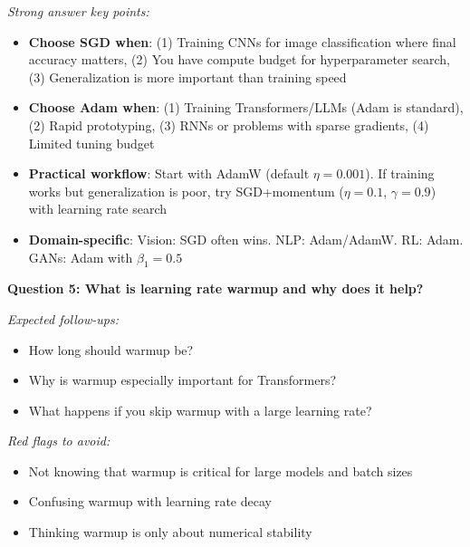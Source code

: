 \documentclass[../../main.tex]{subfiles}
\begin{document}
\begin{interviewquestions}
\textit{Strong answer key points:}
\begin{itemize}
    \item \textbf{Choose SGD when}: (1) Training CNNs for image classification where final accuracy matters, (2) You have compute budget for hyperparameter search, (3) Generalization is more important than training speed
    \item \textbf{Choose Adam when}: (1) Training Transformers/LLMs (Adam is standard), (2) Rapid prototyping, (3) RNNs or problems with sparse gradients, (4) Limited tuning budget
    \item \textbf{Practical workflow}: Start with AdamW (default $\eta=0.001$). If training works but generalization is poor, try SGD+momentum ($\eta=0.1$, $\gamma=0.9$) with learning rate search
    \item \textbf{Domain-specific}: Vision: SGD often wins. NLP: Adam/AdamW. RL: Adam. GANs: Adam with $\beta_1=0.5$
\end{itemize}

\vspace{0.5em}
\textbf{Question 5: What is learning rate warmup and why does it help?}

\textit{Expected follow-ups:}
\begin{itemize}
    \item How long should warmup be?
    \item Why is warmup especially important for Transformers?
    \item What happens if you skip warmup with a large learning rate?
\end{itemize}

\textit{Red flags to avoid:}
\begin{itemize}
    \item Not knowing that warmup is critical for large models and batch sizes
    \item Confusing warmup with learning rate decay
    \item Thinking warmup is only about numerical stability
\end{itemize}


\end{interviewquestions}
\end{document}
